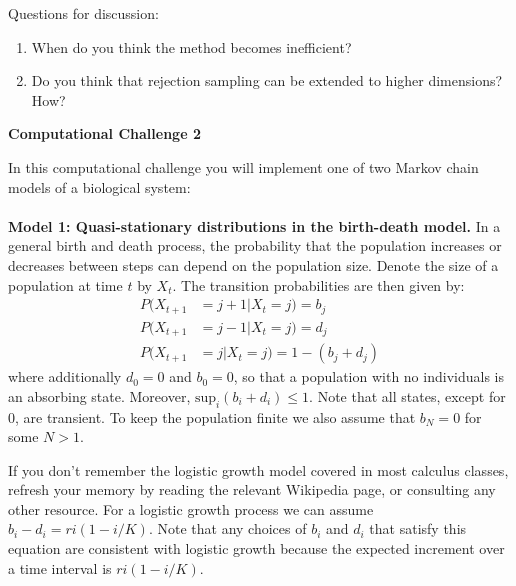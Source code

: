 \documentclass[12pt]{article}
\begin{document}
Questions for discussion:
\begin{enumerate}
\item When do you think the method becomes inefficient?  
\item Do you think that rejection sampling can be extended to higher dimensions? How?
\end{enumerate}

\vskip5mm 


\begin{center}
{\Large \bf Computational Challenge 2
\\ \vskip5mm }
\end{center}


In this computational challenge you will implement one of two Markov chain models of a biological system:
\\
\\
\textbf{Model 1: Quasi-stationary distributions in the birth-death model.}  In a general birth and death process, the probability that the 
population increases or decreases between steps can depend on the population size.  Denote the
size of a population at time $t$ by $X_t$. The transition probabilities are then given by:
\begin{align*}
P(X_{t+1} &= j+1 | X_{t} = j) = b_j \\
P(X_{t+1} &= j-1 | X_{t} = j) = d_j \\
P(X_{t+1} &= j | X_{t} = j) = 1 - ( b_j + d_j) 
\end{align*}
where additionally $d_0 = 0$ and $b_ 0 = 0$, so that a population with no individuals is an absorbing state.  Moreover,
$\text{sup}_i ( b_i + d_i) \leq 1$.  Note that all states, except for 0, are transient.  To keep the population finite we 
also assume that $b_N = 0$ for some $N > 1$.

If you don't remember the logistic growth model covered in most calculus classes, refresh your memory by reading the relevant Wikipedia page, or
consulting any other resource. For a logistic growth process we can assume $b_i - d_i = ri (1 - i/K)$. Note that any choices of $b_i$ and $d_i$
that satisfy this equation are consistent with logistic growth because the expected increment over a time interval is $ri (1 - i/K)$.
\end{document}
